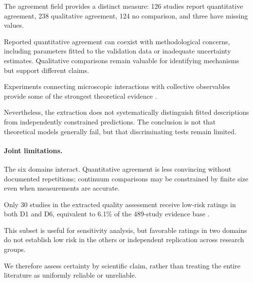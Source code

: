 The agreement field provides a distinct measure:
126 studies report quantitative agreement,
238 qualitative agreement, 124 no comparison,
and three have missing values.

Reported quantitative agreement can coexist
with methodological concerns, including
parameters fitted to the validation data
or inadequate uncertainty estimates.
Qualitative comparisons remain valuable
for identifying mechanisms but support
different claims.

Experiments connecting microscopic interactions
with collective observables provide some
of the strongest theoretical evidence
\cite{Buerle2020formationofstable,Xiao2023perceptionofmotion,Arbel2025amechanicalroutef,Heuthe2025tunablecolloidalsw,Boudet2025nonmarkoviandynami,Chen2024persistentandrespo,Chvykov2020lowrattlingapred,Wang2025hyperuniformnetwork,Zion2023morphologicalcomput,Binysh2026moreislessinunpe}.

Nevertheless, the extraction does not
systematically distinguish fitted descriptions
from independently constrained predictions.
The conclusion is not that theoretical
models generally fail, but that
discriminating tests remain limited.

\paragraph*{Joint limitations.}

The six domains interact. Quantitative agreement
is less convincing without documented repetitions;
continuum comparisons may be constrained by
finite size even when measurements are accurate.

Only 30 studies in the extracted quality
assessment receive low-risk ratings in
both D1 and D6, equivalent to 6.1\%
of the 489-study evidence base
\cite{Garnier2005aggregationbehaviou,Buerle2020formationofstable,Yang2022emergentmicroroboti,Xiao2023perceptionofmotion,Arbel2025amechanicalroutef,Heuthe2025tunablecolloidalsw,Boudet2025nonmarkoviandynami,Casiulis2025ageometricconditio,Chen2024persistentandrespo,Chvykov2020lowrattlingapred,Savoie2019arobotmadeofrobo,Wang2025hyperuniformnetwork,Zion2023morphologicalcomput,Li2020programmingactiveg}.

This subset is useful for sensitivity analysis,
but favorable ratings in two domains do not
establish low risk in the others or
independent replication across research groups.

We therefore assess certainty by scientific
claim, rather than treating the entire
literature as uniformly reliable
or unreliable.

